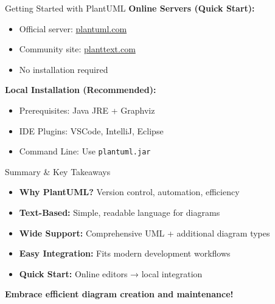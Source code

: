 \documentclass{beamer}
\begin{document}
\begin{frame}{Getting Started with PlantUML}
    \textbf{Online Servers (Quick Start):}
    \begin{itemize}
        \item Official server: \href{http://plantuml.com}{plantuml.com}
        \item Community site: \href{http://planttext.com}{planttext.com}
        \item No installation required
    \end{itemize}
    
    \vspace{0.5cm}
    \textbf{Local Installation (Recommended):}
    \begin{itemize}
        \item Prerequisites: Java JRE + Graphviz
        \item IDE Plugins: VSCode, IntelliJ, Eclipse
        \item Command Line: Use \texttt{plantuml.jar}
    \end{itemize}
\end{frame}

\begin{frame}{Summary \& Key Takeaways}
    \begin{itemize}
        \item \textbf{Why PlantUML?} Version control, automation, efficiency
        \item \textbf{Text-Based:} Simple, readable language for diagrams
        \item \textbf{Wide Support:} Comprehensive UML + additional diagram types
        \item \textbf{Easy Integration:} Fits modern development workflows
        \item \textbf{Quick Start:} Online editors → local integration
    \end{itemize}
    
    \vspace{0.5cm}
    \textbf{Embrace efficient diagram creation and maintenance!}
\end{frame}
\end{document}
